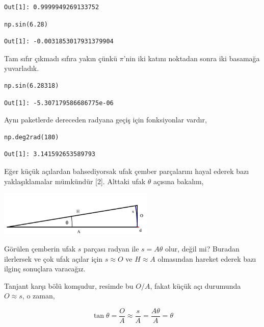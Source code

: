 \documentclass[12pt,fleqn]{article}\usepackage{../../common}
\begin{document}
\begin{verbatim}
Out[1]: 0.9999949269133752
\end{verbatim}

\begin{verbatim}
np.sin(6.28)
\end{verbatim}

\begin{verbatim}
Out[1]: -0.0031853017931379904
\end{verbatim}

Tam sıfır çıkmadı sıfıra yakın çünkü $\pi$'nin iki katını noktadan sonra iki
basamağa yuvarladık.

\begin{verbatim}
np.sin(6.28318)
\end{verbatim}

\begin{verbatim}
Out[1]: -5.307179586686775e-06
\end{verbatim}

Aynı paketlerde dereceden radyana geçiş için fonksiyonlar vardır,

\begin{verbatim}
np.deg2rad(180)
\end{verbatim}

\begin{verbatim}
Out[1]: 3.141592653589793
\end{verbatim}

Eğer küçük açılardan bahsediyorsak ufak çember parçalarını hayal ederek bazı
yaklaşıklamalar mümkündür [2]. Alttaki ufak $\theta$ açısına bakalım,

\includegraphics[width=20em]{ode_mattuck_50_trig_06.jpg}

Görülen çemberin ufak $s$ parçası radyan ile $s = A \theta$ olur, değil mi?
Buradan ilerlersek ve çok ufak açılar için $s \approx O$ ve $H \approx A$
olmasından hareket ederek bazı ilginç sonuçlara varacağız.

Tanjant karşı bölü komşudur, resimde bu $O / A$, fakat küçük açı durumunda
$O \approx s$, o zaman, 

$$
\tan \theta = \frac{O}{A} \approx \frac{s}{A} = \frac{A\theta}{A} = \theta
$$
\end{document}
